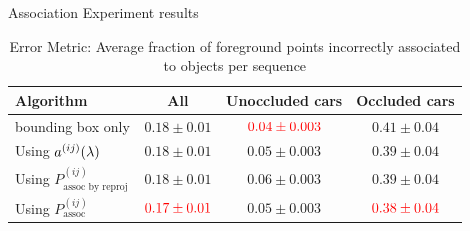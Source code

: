 \begin{frame}{Association Experiment results}
\begin{table}
  \centering
  \begin{tabular}{lccc}
    \toprule
    Algorithm & All & Unoccluded cars & Occluded cars \\
    \midrule
    bounding box only                         & $0.18\pm0.01$          & $\color{red}0.04\pm0.003$  & $0.41\pm0.04$\\
    Using $a^{(ij)}(\lambda){}$                         & $0.18\pm0.01$          & $0.05\pm0.003$           & $0.39\pm0.04$ \\
    Using $P^{(ij)}_{\text{assoc by reproj}}$ & $0.18\pm0.01$          & $0.06\pm0.003$           & $0.39\pm0.04$\\
    Using $P^{(ij)}_{\text{assoc}}$           & $\color{red}0.17\pm0.01$ & $0.05\pm0.003$           & $\color{red}0.38\pm0.04$\\
    \bottomrule
  \end{tabular}
  \caption{Error Metric: Average fraction of foreground points incorrectly associated to objects per sequence}
\end{table}
  
\end{frame}

